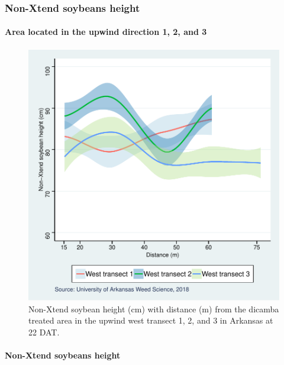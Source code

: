\documentclass[]{article}
\let\oldparagraph\paragraph
\renewcommand{\paragraph}[1]{\oldparagraph{#1}\mbox{}}
\begin{document}
\newpage

\subsubsection{Non-Xtend soybeans
height}\label{non-xtend-soybeans-height}

\paragraph{\texorpdfstring{Area located in the \textbf{upwind} direction
1, 2, and
3}{Area located in the upwind direction 1, 2, and 3}}\label{area-located-in-the-upwind-direction-1-2-and-3-1}

\begin{figure}
\centering
\includegraphics{Report_Dicamba_study_files/figure-latex/unnamed-chunk-14-1.pdf}
\caption{Non-Xtend soybean height (cm) with distance (m) from the
dicamba treated area in the upwind west transect 1, 2, and 3 in Arkansas
at 22 DAT.}
\end{figure}

\pagebreak
\newpage

\paragraph{Non-Xtend soybeans height}\label{non-xtend-soybeans-height-1}
\end{document}
